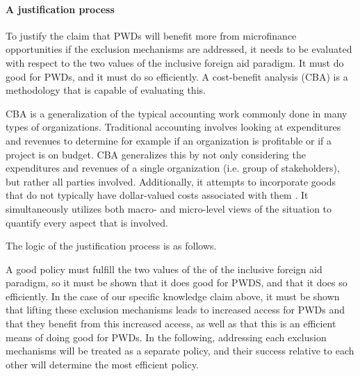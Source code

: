 \documentclass[a4paper]{article}
\begin{document}
\paragraph{A justification process} 

To justify the claim that PWDs will benefit more from microfinance
opportunities if the exclusion mechanisms are addressed, it needs to be
evaluated with respect to the two values of the inclusive foreign aid
paradigm. It must do good for PWDs, and it must do so efficiently. A
cost-benefit analysis (CBA) is a methodology that is capable of evaluating
this.

CBA is a generalization of the typical accounting work commonly done in many
types of organizations. Traditional accounting involves looking at
expenditures and revenues to determine for example if an organization is
profitable or if a project is on budget. CBA generalizes this by not only
considering the expenditures and revenues of a single organization (i.e. group
of stakeholders), but rather all parties involved.  Additionally, it attempts
to incorporate goods that do not typically have dollar-valued costs associated
with them \citep{mishan2015elements}. It simultaneously utilizes both macro-
and micro-level views of the situation to quantify every aspect that is
involved.

The logic of the justification process is as follows. 

A good policy must fulfill the two values of the of the inclusive foreign aid
paradigm, so it must be shown that it does good for PWDS, and that it does so
efficiently. In the case of our specific knowledge claim above, it must be
shown that lifting these exclusion mechanisms leads to increased access for
PWDs and that they benefit from this increased access, as well as that this is
an efficient means of doing good for PWDs. In the following, addressing each
exclusion mechanisms will be treated as a separate policy, and their success
relative to each other will determine the most efficient policy.
\end{document}

